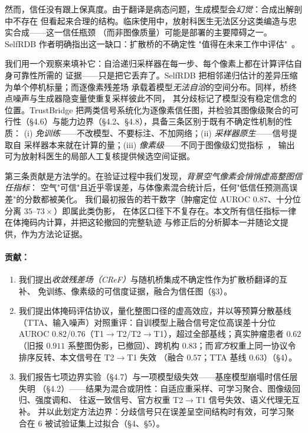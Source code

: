 \documentclass[11pt]{article}
\newcommand{\TrustMap}{信任图}
\begin{document}
然而，信任没有跟上保真度。由于翻译是病态问题，生成模型会\emph{幻觉}：合成出解剖中不存在
但看起来合理的结构。临床使用中，放射科医生无法区分这类编造与忠实合成——这一信任瓶颈
（而非图像质量）可能是部署的主要障碍之一。SelfRDB 作者明确指出这一缺口：扩散桥的不确定性
"值得在未来工作中评估"~\cite{arslan2025selfrdb}。

我们用一个观察来填补它：自洽递归采样器在每一步、每个像素上都在计算评估自身可靠性所需的
证据——只是把它丢弃了。SelfRDB 把相邻递归估计的差异压缩为单个停机标量；而逐像素残差场
承载着模型\emph{无法自洽}的空间分布。同样，桥终点噪声与生成器隐变量使重复采样彼此不同，
其分歧标记了模型没有稳定信念的位置。TrustBridge 把两类信号系统化为逐像素\TrustMap{}，并检验其图像级聚合的可行性（\S4.6）与能力边界（\S4.2、\S4.8），具备三条区别于既有不确定性机制的性质：
(i) \emph{免训练}——不改模型、不要标注、不加网络；(ii) \emph{采样器原生}——信号提取自
采样器本来就在计算的量；(iii) \emph{像素级}——不同于图像级幻觉指标~\cite{tivnan2024hallucinationindex}，
输出可为放射科医生的局部人工复核提供候选空间证据。

第三条贡献是方法学的。在验证过程中我们发现，\emph{背景空气像素会悄悄虚高整图信任指标}：
空气"可信"且近乎零误差，与体像素混合统计后，任何"低信任预测高误差"的分数都被美化。
我们最初报告的若干数字（肿瘤定位 AUROC $0.87$、十分位分离 $35$--$73\times$）即属此类伪影，
在体区口径下不复存在。本文所有信任指标一律在体掩码内计算，并把这轮撤回的完整轨迹
与修正后的分析脚本一并随论文提供，作为方法论证据。

\paragraph{贡献：}
\begin{enumerate}
  \item 我们提出\emph{收敛残差场（CReF）}与随机桥集成不确定性作为扩散桥翻译的互补、
        免训练、像素级的可信度证据，融合为\TrustMap{}（\S3）。
  \item 我们提出体掩码评估协议，量化整图口径的虚高效应，并以等预算分散基线
        （TTA、输入噪声）对照重评：自训模型上融合信号定位高误差十分位 AUROC
        $0.82$/$0.76$（T1$\to$T2/T2$\to$T1），超过全部基线；真实肿瘤患者 $0.62$（旧报
        $0.911$ 系整图伪影，已撤回）、跨机构 $0.83$；而\emph{官方}权重上同一协议令排序反转、本文信号在 T2$\to$T1 失效
        （融合 $0.57$；TTA 基线 $0.63$）（\S4）。
  \item 我们报告七项边界实验（\S4.7）与一项模型级失效——基座模型崩塌时信任层失明
        （\S4.2）——结果为混合或阴性：自适应重采样、可学习聚合、图像级回归、强度调和、
        往返一致信号、官方权重 T2$\to$T1 信号失效、语义代理无互补。
        并以此划定方法边界：分歧信号只在误差呈空间结构时有效，可学习聚合在
        6 被试验证集上过拟合（\S4、\S5）。
\end{enumerate}
\end{document}
